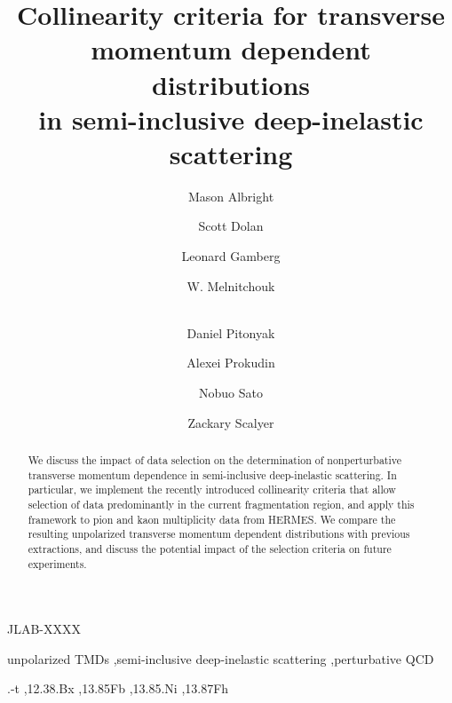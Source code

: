 \documentclass[final,3p,times,onecolumn,sort&compress,hidelinks]{elsarticle}
\begin{document}
\vspace{-3.0cm}
\begin{flushright}
JLAB-XXXX
\vspace{0.5cm}
\end{flushright}

\begin{frontmatter}

\author{Mason Albright}
\author{Scott Dolan}
\author{Leonard Gamberg}
\author{W. Melnitchouk}
\author{\\Daniel Pitonyak}
\author{Alexei Prokudin} 
\author{Nobuo Sato}
\author{Zackary Scalyer}
\address[label1]{College of Engineering, Penn State University, State College, Pennsylvania 16801, USA}
\address[label2]{Division of Science, Penn State University Berks, Reading, Pennsylvania 19610, USA}
\address[label3]{Theory Center, Jefferson Lab, 12000 Jefferson Avenue, Newport News, Virginia 23606, USA}
\address[label4]{Department of Physics, Old Dominion University, Norfolk, VA 23529, USA}
\address[label5]{Department of Mathematics and Statistics, Villanova University, Villanova, PA 19085, USA}


\title{Collinearity criteria for transverse momentum dependent
	distributions \\ in semi-inclusive deep-inelastic scattering}


\begin{abstract}
We discuss the impact of data selection on the determination of
nonperturbative transverse momentum dependence in semi-inclusive 
deep-inelastic scattering. In particular, we implement the recently
introduced collinearity criteria that allow selection of data
predominantly in the current fragmentation region, and apply this
framework to pion and kaon multiplicity data from HERMES.
We compare the resulting unpolarized transverse momentum dependent
distributions with previous extractions, and discuss the potential
impact of the selection criteria on future experiments.
\end{abstract}

\begin{keyword}
unpolarized TMDs \sep semi-inclusive deep-inelastic scattering \sep perturbative QCD

.-t \sep 12.38.Bx \sep  13.85Fb \sep 13.85.Ni \sep 13.87Fh

\end{keyword}

\end{frontmatter}
\end{document}

